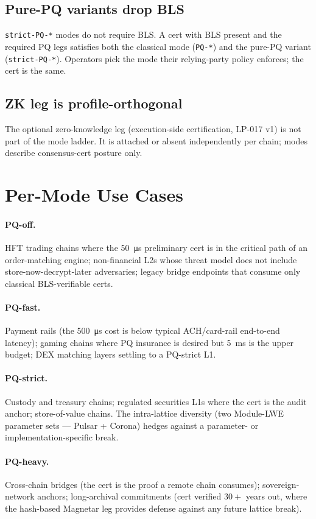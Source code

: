 \subsection{Pure-PQ variants drop BLS}

\texttt{strict-PQ-*} modes do not require BLS. A cert with BLS
present and the required PQ legs satisfies both the classical mode
(\texttt{PQ-*}) and the pure-PQ variant (\texttt{strict-PQ-*}).
Operators pick the mode their relying-party policy enforces; the
cert is the same.

\subsection{ZK leg is profile-orthogonal}

The optional zero-knowledge leg (execution-side certification,
LP-017 v1) is not part of the mode ladder. It is attached or
absent independently per chain; modes describe consensus-cert
posture only.

\section{Per-Mode Use Cases}

\paragraph{PQ-off.} HFT trading chains where the
\SI{50}{\micro\second} preliminary cert is in the critical path of
an order-matching engine; non-financial L2s whose threat model
does not include store-now-decrypt-later adversaries; legacy
bridge endpoints that consume only classical BLS-verifiable certs.

\paragraph{PQ-fast.} Payment rails (the
\SI{500}{\micro\second} cost is below typical ACH/card-rail
end-to-end latency); gaming chains where PQ insurance is desired
but \SI{5}{\milli\second} is the upper budget; DEX matching layers
settling to a PQ-strict L1.

\paragraph{PQ-strict.} Custody and treasury chains; regulated
securities L1s where the cert is the audit anchor; store-of-value
chains. The intra-lattice diversity (two Module-LWE parameter
sets --- Pulsar + Corona) hedges against a parameter- or
implementation-specific break.

\paragraph{PQ-heavy.} Cross-chain bridges (the cert is the proof a
remote chain consumes); sovereign-network anchors; long-archival
commitments (cert verified $30{+}$ years out, where the
hash-based Magnetar leg provides defense against any future lattice
break).
